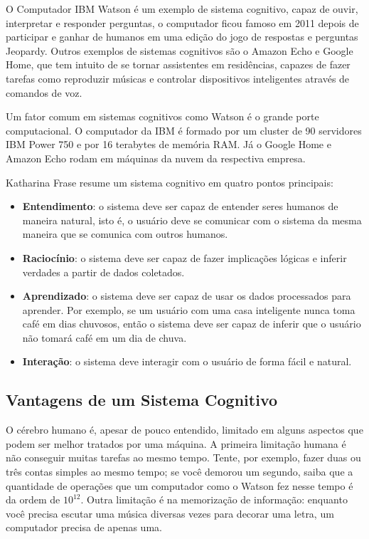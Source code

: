 \documentclass[12pt]{article}
\begin{document}
O Computador IBM Watson é um exemplo de sistema cognitivo, capaz de 
ouvir, interpretar e responder perguntas, o computador ficou famoso 
em 2011 depois de participar e ganhar de humanos em uma edição do jogo 
de respostas e perguntas Jeopardy. Outros exemplos de sistemas 
cognitivos são o Amazon Echo e Google Home, que tem intuito de se tornar
assistentes em residências, capazes de fazer tarefas como reproduzir
músicas e controlar dispositivos inteligentes através de comandos de
voz.

Um fator comum em sistemas cognitivos como Watson é o grande porte 
computacional. O computador da IBM é formado por um cluster de 90 
servidores IBM Power 750 e por 16 terabytes de memória RAM. Já o
Google Home e Amazon Echo rodam em máquinas da nuvem da respectiva
empresa.

Katharina Frase resume um sistema cognitivo em quatro pontos principais:
\begin{itemize}
\item{\textbf {Entendimento}:} o sistema deve ser capaz de entender 
seres humanos de maneira natural, isto é, o usuário deve se comunicar
com o sistema da mesma maneira que se comunica com outros humanos.

\item{\textbf {Raciocínio}:} o sistema deve ser capaz de fazer
implicações lógicas e inferir verdades a partir de dados coletados.

\item{\textbf {Aprendizado}:} o sistema deve ser capaz de usar os dados 
processados para aprender. Por exemplo, se um usuário com uma casa 
inteligente nunca toma café em dias chuvosos, então o sistema deve ser
capaz de inferir que o usuário não tomará café em um dia de chuva.

\item{\textbf {Interação}:} o sistema deve interagir com o usuário de 
forma fácil e natural.
\end{itemize}

\subsection{Vantagens de um Sistema Cognitivo}
O cérebro humano é, apesar de pouco entendido, limitado em alguns 
aspectos que podem ser melhor tratados por uma máquina. A primeira 
limitação humana é não conseguir muitas tarefas ao mesmo tempo. Tente,
por exemplo, fazer duas ou três contas simples ao mesmo tempo; se você
demorou um segundo, saiba que a quantidade de operações que um 
computador como o Watson fez nesse tempo é da ordem de $10^{12}$. Outra
limitação é na memorização de informação: enquanto você precisa escutar
uma música diversas vezes para decorar uma letra, um computador precisa
de apenas uma.
\end{document}
